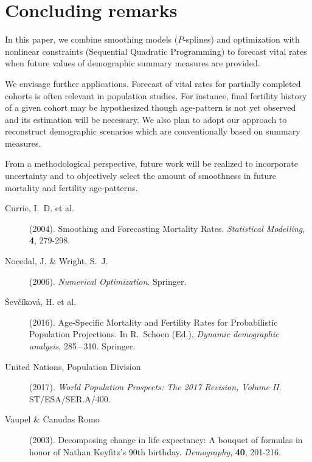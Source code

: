 \documentclass[twoside]{report}
\begin{document}
\section{Concluding remarks}

In this paper, we combine smoothing models ($P$-splines) and optimization with nonlinear constraints (Sequential Quadratic Programming) to forecast vital rates when future values of demographic summary measures are provided. 

We envisage further applications. Forecast of vital rates for partially completed cohorts is often relevant in population studies. For instance, final fertility history of a given cohort may be hypothesized though age-pattern is not yet observed and its estimation will be necessary. We also plan to adopt our approach to reconstruct demographic scenarios which are conventionally based on summary measures. 

From a methodological perspective, future work will be realized to incorporate uncertainty and to objectively select the amount of smoothness in future mortality and fertility age-patterns.

\begin{description}
\item[Currie, I.~D. et al.]
	(2004). Smoothing and Forecasting Mortality Rates. {\it Statistical
	Modelling}, {\bf 4}, 279-298.
\item[Nocedal, J. \& Wright, S.~J.] (2006). {\it Numerical Optimization}. Springer.
\item[\v{S}ev\v{c}\'ikov\'a, H. et al.] (2016). 
Age-Specific Mortality and Fertility Rates for Probabilistic Population Projections. In R.~Schoen
(Ed.), {\it Dynamic demographic analysis}, 285\,--\,310. Springer.
\item[United Nations, Population Division] (2017). 
{\it World Population Prospects: The 2017 Revision, Volume II}. ST/ESA/SER.A/400.
\item[Vaupel \& Canudas Romo] (2003). Decomposing change in life expectancy: A bouquet of
formulas in honor of Nathan Keyfitz's 90th birthday. {\it Demography}, {\bf 40}, 201-216.
\end{description}
\end{document}
